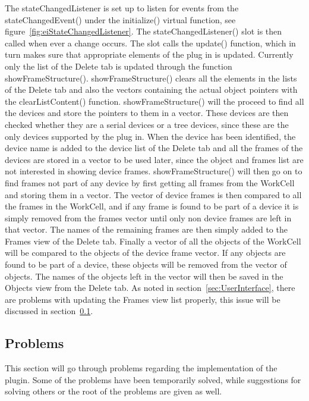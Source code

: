 The stateChangedListener is set up to listen for events from the stateChangedEvent() under the initialize() virtual function, see figure~\ref{fig:eiStateChangedListener}. The stateChangedListener() slot is then called when ever a change occurs. The slot calls the update() function, which in turn makes sure that appropriate elements of the plug in is updated. Currently only the list of the Delete tab is updated through the function showFrameStructure(). showFrameStructure() clears all the elements in the lists of the Delete tab and also the vectors containing the actual object pointers with the clearListContent() function. showFrameStructure() will the proceed to find all the devices and store the pointers to them in a vector. These devices are then checked whether they are a serial devices or a tree devices, since these are the only devices supported by the plug in. When the device has been identified, the device name is added to the device list of the Delete tab and all the frames of the devices are stored in a vector to be used later, since the object and frames list are not interested in showing device frames. 
showFrameStructure() will then go on to find frames not part of any device by first getting all frames from the WorkCell and storing them in a vector. The vector of device frames is then compared to all the frames in the WorkCell, and if any frame is found to be part of a device it is simply removed from the frames vector until only non device frames are left in that vector. The names of the remaining frames are then simply added to the Frames view of the Delete tab.
Finally a vector of all the objects of the WorkCell will be compared to the objects of the device frame vector. If any objects are found to be part of a device, these objects will be removed from the vector of objects. The names of the objects left in the vector will then be saved in the Objects view from the Delete tab.
As noted in section~\ref{sec:UserInterface}, there are problems with updating the Frames view list properly, this issue will be discussed in section~\ref{sec:eiProblems}.


\subsection{Problems}
\label{sec:eiProblems}
This section will go through problems regarding the implementation of the plugin. Some of the problems have been temporarily solved, while suggestions for solving others or the root of the problems are given as well. \\

